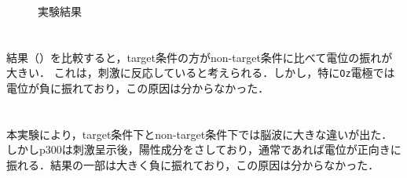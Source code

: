 \begin{figure}[H]
\begin{minipage}[b]{.3\textwidth}
    \end{minipage}
    \caption{\kadaie 実験結果}
    \label{fig:実験結果\kadaie}
\end{figure}
\clearpage
\section{\consideration}
結果（）を比較すると，target条件の方がnon-target条件に比べて電位の振れが大きい．
これは，刺激に反応していると考えられる．しかし，特に\texttt{Oz}電極では電位が負に振れており，この原因は分からなかった．
\section{\conclusion}
本実験により，target条件下とnon-target条件下では脳波に大きな違いが出た．
しかしp300は刺激呈示後，陽性成分をさしており，通常であれば電位が正向きに振れる．結果の一部は大きく負に振れており，この原因は分からなかった．